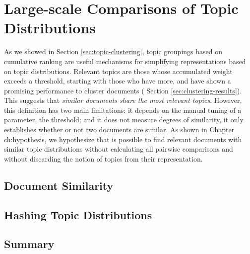 

\chapter{Large-scale Comparisons of Topic Distributions}\label{ch:comparisons}

\graphicspath{{comparisons/figures/}}


As we showed in Section \ref{sec:topic-clustering}, topic groupings based on cumulative ranking are useful mechanisms for simplifying representations based on topic distributions. Relevant topics are those whose accumulated weight exceeds a threshold, starting with those who have more, and have shown a promising performance to cluster documents ( Section \ref{sec:clustering-results}). This suggests that \textit{similar documents share the most relevant topics}. However, this definition has two main limitations: it depends on the manual tuning of a parameter, the threshold; and it does not measure degrees of similarity, it only establishes whether or not two documents are similar. As shown in Chapter {ch:hypothesis}, we hypothesize that is possible to find relevant documents with similar topic distributions without calculating all pairwise comparisons and without discarding the notion of topics from their representation. 

\section{Document Similarity}

\section{Hashing Topic Distributions}

\section{Summary}